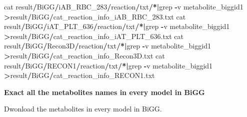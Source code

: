 \documentclass[
]{book}
\newenvironment{Shaded}{\begin{snugshade}}{\end{snugshade}}
\newcommand{\ErrorTok}[1]{\textcolor[rgb]{0.64,0.00,0.00}{\textbf{#1}}}
\newcommand{\NormalTok}[1]{#1}
\newcommand{\SpecialCharTok}[1]{\textcolor[rgb]{0.81,0.36,0.00}{\textbf{#1}}}
\begin{document}
\begin{Shaded}
\begin{Highlighting}[]
\NormalTok{cat result}\SpecialCharTok{/}\NormalTok{BiGG}\SpecialCharTok{/}\NormalTok{iAB\_RBC\_283}\SpecialCharTok{/}\NormalTok{reaction}\SpecialCharTok{/}\NormalTok{txt}\SpecialCharTok{/}\ErrorTok{*|}\NormalTok{grep }\SpecialCharTok{{-}}\NormalTok{v metabolite\_biggid1 }\SpecialCharTok{\textgreater{}}\NormalTok{result}\SpecialCharTok{/}\NormalTok{BiGG}\SpecialCharTok{/}\NormalTok{cat\_reaction\_info\_iAB\_RBC\_283.txt}
\NormalTok{cat result}\SpecialCharTok{/}\NormalTok{BiGG}\SpecialCharTok{/}\NormalTok{iAT\_PLT\_636}\SpecialCharTok{/}\NormalTok{reaction}\SpecialCharTok{/}\NormalTok{txt}\SpecialCharTok{/}\ErrorTok{*|}\NormalTok{grep }\SpecialCharTok{{-}}\NormalTok{v metabolite\_biggid1 }\SpecialCharTok{\textgreater{}}\NormalTok{result}\SpecialCharTok{/}\NormalTok{BiGG}\SpecialCharTok{/}\NormalTok{cat\_reaction\_info\_iAT\_PLT\_636.txt}
\NormalTok{cat result}\SpecialCharTok{/}\NormalTok{BiGG}\SpecialCharTok{/}\NormalTok{Recon3D}\SpecialCharTok{/}\NormalTok{reaction}\SpecialCharTok{/}\NormalTok{txt}\SpecialCharTok{/}\ErrorTok{*|}\NormalTok{grep }\SpecialCharTok{{-}}\NormalTok{v metabolite\_biggid1 }\SpecialCharTok{\textgreater{}}\NormalTok{result}\SpecialCharTok{/}\NormalTok{BiGG}\SpecialCharTok{/}\NormalTok{cat\_reaction\_info\_Recon3D.txt}
\NormalTok{cat result}\SpecialCharTok{/}\NormalTok{BiGG}\SpecialCharTok{/}\NormalTok{RECON1}\SpecialCharTok{/}\NormalTok{reaction}\SpecialCharTok{/}\NormalTok{txt}\SpecialCharTok{/}\ErrorTok{*|}\NormalTok{grep }\SpecialCharTok{{-}}\NormalTok{v metabolite\_biggid1 }\SpecialCharTok{\textgreater{}}\NormalTok{result}\SpecialCharTok{/}\NormalTok{BiGG}\SpecialCharTok{/}\NormalTok{cat\_reaction\_info\_RECON1.txt}
\end{Highlighting}
\end{Shaded}

\textbf{Exact all the metabolites names in every model in BiGG}

Dwonload the metabolites in every model in BiGG.
\end{document}
